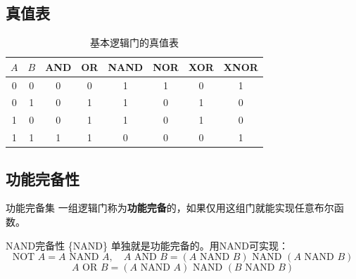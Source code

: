 \subsection{真值表}

\begin{table}[H]
\centering
\begin{tabular}{cc|cccccc}
\toprule
\(A\) & \(B\) & AND & OR & NAND & NOR & XOR & XNOR \\
\midrule
0 & 0 & 0 & 0 & 1 & 1 & 0 & 1 \\
0 & 1 & 0 & 1 & 1 & 0 & 1 & 0 \\
1 & 0 & 0 & 1 & 1 & 0 & 1 & 0 \\
1 & 1 & 1 & 1 & 0 & 0 & 0 & 1 \\
\bottomrule
\end{tabular}
\caption{基本逻辑门的真值表}
\end{table}

\subsection{功能完备性}

\begin{mydefinition}{功能完备集}
一组逻辑门称为\textbf{功能完备}的，如果仅用这组门就能实现任意布尔函数。
\end{mydefinition}

\begin{myTheorem}{NAND完备性}
\{NAND\} 单独就是功能完备的。用NAND可实现：
\[
\text{NOT }A = A\text{ NAND }A,\quad
A\text{ AND }B = (A\text{ NAND }B)\text{ NAND }(A\text{ NAND }B)
\]
\[
A\text{ OR }B = (A\text{ NAND }A)\text{ NAND }(B\text{ NAND }B)
\]
\end{myTheorem}

